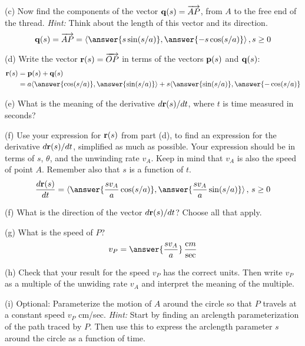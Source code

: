 \documentclass{ximera}
\begin{document}
\begin{question}
(c) Now find the components of the vector ${\bf q}(s) = \overrightarrow{AP}$, from $A$ to the free end of the thread. {\it Hint:} Think about the length of this vector and its direction.
\[
     {\bf q}(s) = \overrightarrow{AP} = \langle \answer{s \sin (s/a)} , \answer{-s \cos (s/a)}  \rangle \, , s\geq 0
\]

(d) Write the vector ${\bf r}(s) = \overrightarrow{OP}$ in terms of the vectors ${\bf p}(s)$ and ${\bf q}(s)$:
\begin{align*}
  {\bf r}(s)   &= {\bf p}(s) + {\bf q}(s)   \\
                  &= a \langle \answer{\cos (s/a)} , \answer{\sin (s/a)}  \rangle  +  s \langle \answer{\sin (s/a)} , \answer{-\cos (s/a)}
\end{align*}


(e) What is the meaning of the derivative $d{\bf r}(s)/dt$, where $t$ is time measured in seconds?
\begin{multipleChoice}  
\end{multipleChoice} 


(f) Use your expression for ${\bf r}(s)$ from part (d), to find an expression for the derivative $d{\bf r}(s)/dt$, simplified as much as possible. Your expression should be in terms of $s$, $\theta$, and the unwinding rate $v_A$. Keep in mind that $v_A$ is also the speed of point $A$. Remember also that $s$ is a function of $t$.
\[
      \frac{d{\bf r}(s)}{dt} = \langle  \answer{\frac{s v_A}{a} \cos(s/a)}  , \answer{\frac{sv_A}{a} \sin(s/a)}   \rangle \, , \, s\geq 0 
\]


(f) What is the direction of the vector $d{\bf r}(s)/dt$? Choose all that apply.
\begin{selectAll}  
  \end{selectAll} 


(g) What is the speed of $P$?
\[
   v_P = \answer{\frac{sv_A}{a}} \,    \frac{\text cm}{\text{sec}}
\]


(h) Check that your result for the speed $v_P$ has the correct units. Then write $v_P$ as a multiple of the unwiding rate $v_A$ and interpret the meaning of the multiple.

(i) Optional: Parameterize the motion of $A$ around the circle so that $P$ travels at a constant speed $v_P$ cm/sec. {\it Hint:} Start by finding an arclength parameterization of the path traced by $P$. Then use this to express the arclength parameter $s$ around the circle as a function of time.

\end{question}
\end{document}
